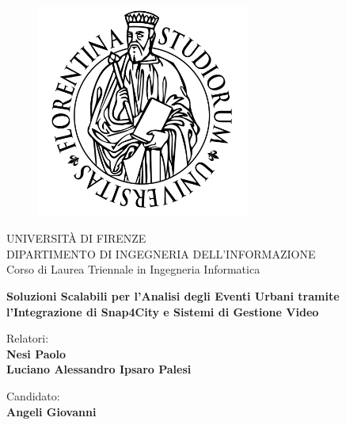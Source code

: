 \renewcommand{\baselinestretch}{1} 

\begin{titlepage}
\begin{figure}[!htb]
    \centering
    \includegraphics[width=7cm]{unifi.png}
\end{figure}

\begin{center}
    \LARGE{UNIVERSITÀ DI FIRENZE}
    \vspace{4mm}
    \\ \large{DIPARTIMENTO DI INGEGNERIA DELL'INFORMAZIONE }
    \vspace{4mm}
    \\ \LARGE{Corso di Laurea Triennale in Ingegneria Informatica}
\end{center}

\vspace{15mm}
\begin{center}
    {\LARGE{\bf Soluzioni Scalabili per l'Analisi degli Eventi Urbani tramite l'Integrazione di Snap4City e Sistemi di Gestione Video}}
\end{center}
\vspace{25mm}

\begin{minipage}[t]{0.5\textwidth}
	{\large{Relatori:}{\normalsize
	\bf\\ \large{Nesi Paolo\\Luciano Alessandro Ipsaro Palesi}}}
\end{minipage}
\hfill
\begin{minipage}[t]{0.45\textwidth}\raggedleft
	{\large{Candidato:}{\normalsize\vspace{3mm} \bf\\ \large{Angeli Giovanni\\ }}}
\end{minipage}

\vspace{10mm}
\hrulefill
\\

\end{titlepage}